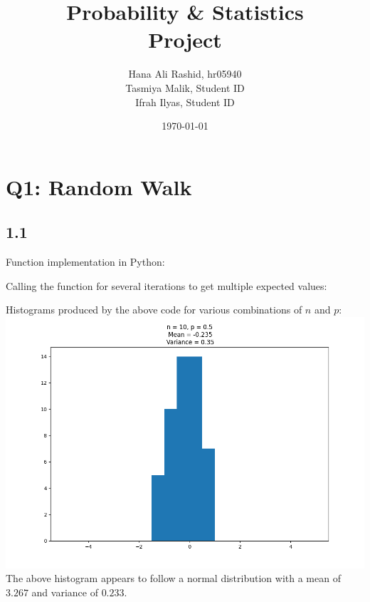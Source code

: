 \documentclass[answers]{exam}
\title{Probability \& Statistics\\ Project}
\author{Hana Ali Rashid, hr05940\\ Tasmiya Malik, Student ID\\ Ifrah Ilyas, Student ID}
\date{\today{}}
\begin{document}
\maketitle



\section*{Q1: Random Walk}
\subsection*{1.1}
Function implementation in Python:

Calling the function for several iterations to get multiple expected values:

\pagebreak
Histograms produced by the above code for various combinations of $n$ and $p$:\\
\includegraphics[scale = 0.5]{Q1_histograms/q1_n = 10_ p = 0.5.png}\\
The above histogram appears to follow a normal distribution with a mean of $3.267$ and variance of $0.233$.\\
\end{document}
